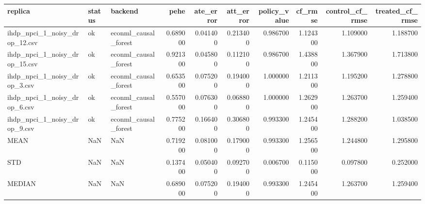 \begin{tabular}{lllrrrrrrr}
\toprule
replica & status & backend & pehe & ate_error & att_error & policy_value & cf_rmse & control_cf_rmse & treated_cf_rmse \\
\midrule
ihdp_npci_1_noisy_drop_12.csv & ok & econml_causal_forest & 0.689000 & 0.041400 & 0.213400 & 0.986700 & 1.124300 & 1.109000 & 1.188700 \\
ihdp_npci_1_noisy_drop_15.csv & ok & econml_causal_forest & 0.921300 & 0.045800 & 0.112100 & 0.986700 & 1.438800 & 1.367900 & 1.713800 \\
ihdp_npci_1_noisy_drop_3.csv & ok & econml_causal_forest & 0.653500 & 0.075200 & 0.194000 & 1.000000 & 1.211300 & 1.195200 & 1.278800 \\
ihdp_npci_1_noisy_drop_6.csv & ok & econml_causal_forest & 0.557000 & 0.076300 & 0.068800 & 1.000000 & 1.262900 & 1.263700 & 1.259400 \\
ihdp_npci_1_noisy_drop_9.csv & ok & econml_causal_forest & 0.775200 & 0.166400 & 0.306800 & 0.993300 & 1.245400 & 1.288200 & 1.038500 \\
MEAN & NaN & NaN & 0.719200 & 0.081000 & 0.179000 & 0.993300 & 1.256500 & 1.244800 & 1.295800 \\
STD & NaN & NaN & 0.137400 & 0.050400 & 0.092700 & 0.006700 & 0.115000 & 0.097800 & 0.252000 \\
MEDIAN & NaN & NaN & 0.689000 & 0.075200 & 0.194000 & 0.993300 & 1.245400 & 1.263700 & 1.259400 \\
\bottomrule
\end{tabular}
